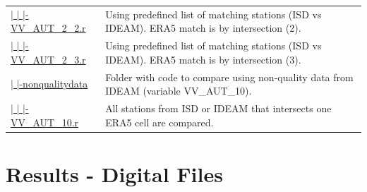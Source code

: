 \documentclass[12pt,twoside]{reedthesis}
\begin{document}
\begin{longtable}[t]{>{\raggedright\arraybackslash}p{1.3in}>{\raggedright\arraybackslash}p{4.9in}}
\href{ftp://ftp.geocorp.co/windthesis/code/downscaling/qualitydata/comparing_VV_AUT_2_2.r}{  |    |    |-VV\_AUT\_2\_2.r} & Using predefined list of matching stations (ISD vs IDEAM). ERA5 match is by intersection (2).\\
\href{ftp://ftp.geocorp.co/windthesis/code/downscaling/qualitydata/comparing_VV_AUT_2_3.r}{  |    |    |-VV\_AUT\_2\_3.r} & Using predefined list of matching stations (ISD vs IDEAM). ERA5 match is by intersection (3).\\
\href{ftp://ftp.geocorp.co/windthesis/code/downscaling/nonqualitydata/}{  |    |-nonqualitydata} & Folder with code to compare using non-quality data from IDEAM (variable VV\_AUT\_10).\\
\href{ftp://ftp.geocorp.co/windthesis/code/downscaling/nonqualitydata/comparing_VV_AUT_10.r}{  |    |    |-VV\_AUT\_10.r} & All stations from ISD or IDEAM that intersects one ERA5 cell are compared.\\
\bottomrule
\end{longtable}
\endgroup{}

\hypertarget{results}{%
\chapter{Results - Digital Files}\label{results}}
\end{document}
